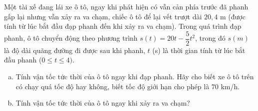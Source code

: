 \begin{bt}%
	Một tài xế đang lái xe ô tô, ngay khi phát hiện có vẫn cản phía trước đã phanh gấp lại nhưng vẫn xảy ra va chạm, chiếc ô tô để lại vết trượt dài $20{,}4$ m (được tính từ lúc bắt đầu đạp phanh đến khi xảy ra va chạm). Trong quá trình đạp phanh, ô tô chuyển động theo phương trình $s(t)=20t-\dfrac{5}{2}t^2$, trong đó $s(m)$ là độ dài quãng đường đi được sau khi phanh, $t$ (s) là thời gian tính từ lúc bắt đầu phanh ($0\leq t\leq 4)$.
	\begin{enumerate}[a)]
		\item Tính vận tốc tức thời của ô tô ngay khi đạp phanh. Hãy cho biết xe ô tô trên có chạy quá tốc độ hay không, biết tốc độ giới hạn cho phép là $70$ km/h.
		\item Tính vận tốc tức thời của ô tô ngay khi xảy ra va chạm?
	\end{enumerate}
\end{bt}

